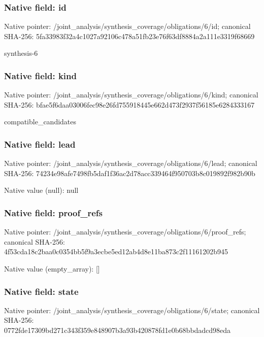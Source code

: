 \documentclass[10pt,a4paper]{article}
\begin{document}
\subsubsection{Native field: id}
Native pointer: /joint\_\allowbreak{}analysis/synthesis\_\allowbreak{}coverage/obligations/6/id; canonical SHA-256: 5fa33983f32a4c1027a92106c478a51fb23e76f63df8884a2a111e3319f68669

\begingroup\raggedright\sloppy synthesis-6\par\endgroup

\subsubsection{Native field: kind}
Native pointer: /joint\_\allowbreak{}analysis/synthesis\_\allowbreak{}coverage/obligations/6/kind; canonical SHA-256: bfae5f6daa03006fec98e26fd755918445e662d473f2937f56185e6284333167

\begingroup\raggedright\sloppy compatible\_\allowbreak{}candidates\par\endgroup

\subsubsection{Native field: lead}
Native pointer: /joint\_\allowbreak{}analysis/synthesis\_\allowbreak{}coverage/obligations/6/lead; canonical SHA-256: 74234e98afe7498fb5daf1f36ac2d78acc339464f950703b8c019892f982b90b

Native value (null): null

\subsubsection{Native field: proof\_\allowbreak{}refs}
Native pointer: /joint\_\allowbreak{}analysis/synthesis\_\allowbreak{}coverage/obligations/6/proof\_\allowbreak{}refs; canonical SHA-256: 4f53cda18c2baa0c0354bb5f9a3ecbe5ed12ab4d8e11ba873c2f11161202b945

Native value (empty\_\allowbreak{}array): []

\subsubsection{Native field: state}
Native pointer: /joint\_\allowbreak{}analysis/synthesis\_\allowbreak{}coverage/obligations/6/state; canonical SHA-256: 0772fde17309bd271c343f359e848907b3a93b420878fd1e0b68bbdadcd98eda
\end{document}
